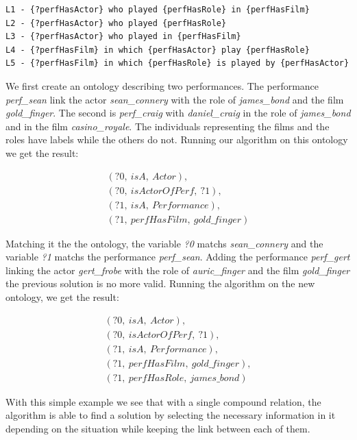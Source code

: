 \begin{lstlisting}[frame=single, caption={ The set of labels usable to discribe the performance compound relation.}, label={lst:chap7_perf_labels}, captionpos=b, style=Labels, mathescape=true]
L1 - {?perfHasActor} who played {perfHasRole} in {perfHasFilm}
L2 - {?perfHasActor} who played {perfHasRole}
L3 - {?perfHasActor} who played in {perfHasFilm}
L4 - {?perfHasFilm} in which {perfHasActor} play {perfHasRole}
L5 - {?perfHasFilm} in which {perfHasRole} is played by {perfHasActor}
\end{lstlisting}

We first create an ontology describing two performances. The performance \textit{perf\_sean} link the actor \textit{sean\_connery} with the role of \textit{james\_bond} and the film \textit{gold\_finger}. The second is \textit{perf\_craig} with \textit{daniel\_craig} in the role of \textit{james\_bond} and in the film \textit{casino\_royale}. The individuals representing the films and the roles have labels while the others do not. Running our algorithm on this ontology we get the result:

\begin{gather*}
(?0,\ isA,\ Actor),\\
(?0,\ isActorOfPerf,\ ?1),\\
(?1,\ isA,\ Performance),\\
(?1,\ perfHasFilm,\ gold\_finger)
\end{gather*}

Matching it the the ontology, the variable \textit{?0} matchs \textit{sean\_connery} and the variable \textit{?1} matchs the performance \textit{perf\_sean}. Adding the performance \textit{perf\_gert} linking the actor \textit{gert\_frobe} with the role of \textit{auric\_finger} and the film \textit{gold\_finger} the previous solution is no more valid. Running the algorithm on the new ontology, we get the result:

\begin{gather*}
(?0,\ isA,\ Actor),\\
(?0,\ isActorOfPerf,\ ?1),\\
(?1,\ isA,\ Performance),\\
(?1,\ perfHasFilm,\ gold\_finger),\\
(?1,\ perfHasRole,\ james\_bond)
\end{gather*}

With this simple example we see that with a single compound relation, the algorithm is able to find a solution by selecting the necessary information in it depending on the situation while keeping the link between each of them.

